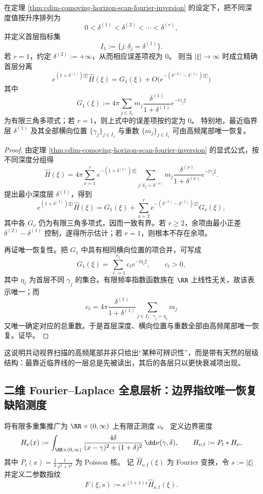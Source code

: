 \begin{theorem}\label{thm:cdim-comoving-horizon-scan-first-layer-extraction}
在定理 \ref{thm:cdim-comoving-horizon-scan-fourier-inversion} 的设定下，把不同深度值按升序排列为
\[
0<\delta^{(1)}<\delta^{(2)}<\cdots<\delta^{(r)},
\]
并定义首层指标集
\[
I_1:=\{j:\delta_j=\delta^{(1)}\}.
\]
若 \(r=1\)，约定 \(\delta^{(2)}:=+\infty\)，从而相应误差项视为 \(0\)。
则当 \(|\xi|\to\infty\) 时成立精确首层分离
\[
\boxed{\;
e^{(1+\delta^{(1)})|\xi|}\widehat H(\xi)
=
G_1(\xi)+
O\!\bigl(e^{-(\delta^{(2)}-\delta^{(1)})|\xi|}\bigr)\;}
\]
其中
\[
G_1(\xi):=
4\pi\sum_{j\in I_1}m_j\frac{\delta^{(1)}}{1+\delta^{(1)}}e^{-\mathrm{i}\gamma_j\xi}
\]
为有限三角多项式；若 \(r=1\)，则上式中的误差项按约定为 \(0\)。
特别地，最近临界层 \(\delta^{(1)}\) 及其全部横向位置 \(\{\gamma_j\}_{j\in I_1}\) 与重数 \(\{m_j\}_{j\in I_1}\) 可由高频尾部唯一恢复。
\end{theorem}
\begin{proof}
由定理 \ref{thm:cdim-comoving-horizon-scan-fourier-inversion} 的显式公式，按不同深度分组得
\[
\widehat H(\xi)
=
4\pi\sum_{\nu=1}^{r}
e^{-(1+\delta^{(\nu)})|\xi|}
\sum_{j:\delta_j=\delta^{(\nu)}}
m_j\frac{\delta^{(\nu)}}{1+\delta^{(\nu)}}e^{-\mathrm{i}\gamma_j\xi}.
\]
提出最小深度层 \(\delta^{(1)}\)，得到
\[
e^{(1+\delta^{(1)})|\xi|}\widehat H(\xi)
=
G_1(\xi)+
\sum_{\nu=2}^{r}
e^{-(\delta^{(\nu)}-\delta^{(1)})|\xi|}
G_\nu(\xi),
\]
其中各 \(G_\nu\) 仍为有限三角多项式，因而一致有界。若 \(r\ge 2\)，余项由最小正差
\(\delta^{(2)}-\delta^{(1)}\) 控制，遂得所示估计；若 \(r=1\)，则根本不存在余项。
\par
再证唯一恢复性。把 \(G_1\) 中具有相同横向位置的项合并，可写成
\[
G_1(\xi)=\sum_{\ell=1}^{r_1} c_\ell e^{-\mathrm{i}\eta_\ell\xi},
\qquad
c_\ell>0,
\]
其中 \(\eta_\ell\) 为首层不同 \(\gamma_j\) 的集合。有限频率指数函数族在 \(\RR\) 上线性无关，故该表示唯一；而
\[
c_\ell=
4\pi\frac{\delta^{(1)}}{1+\delta^{(1)}}
\sum_{j\in I_1:\,\gamma_j=\eta_\ell}m_j
\]
又唯一确定对应的总重数。于是首层深度、横向位置与重数全部由高频尾部唯一恢复。证毕。
\end{proof}
这说明共动视界扫描的高频尾部并非只给出“某种可辨识性”，而是带有天然的层级结构：最靠近临界线的一层总是先被读出，其后的各层只以更快衰减项出现。

\subsection{二维 Fourier--Laplace 全息层析：边界指纹唯一恢复缺陷测度}\label{subsec:cdim-fourier-laplace-holographic-tomography}
将有限多重集推广为 \(\RR\times(0,\infty)\) 上有限正测度 \(\nu\)。
定义边界密度
\[
H_\nu(x):=\int_{\RR\times(0,\infty)}\frac{4\delta}{(x-\gamma)^2+(1+\delta)^2}\,\dd\nu(\gamma,\delta),
\qquad
H_{\nu,t}:=P_t*H_\nu,
\]
其中 \(P_t(x)=\frac{1}{\pi}\frac{t}{x^2+t^2}\) 为 Poisson 核。
记 \(\widehat H_{\nu,t}(\xi)\) 为 Fourier 变换，令 \(s:=|\xi|\) 并定义二参数指纹
\[
F(\xi,s):=e^{(t+1)s}\widehat H_{\nu,t}(\xi).
\]

